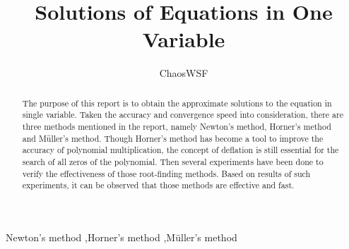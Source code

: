 \documentclass[preprint,12pt]{elsarticle}
\begin{document}
\begin{frontmatter}


\title{Solutions of Equations in One Variable}




\author{ChaosWSF}

\address{No.0, University}

\begin{abstract}
The purpose of this report is to obtain the approximate solutions to the equation in single variable. Taken the accuracy and convergence speed into consideration, there are three methods mentioned in the report, namely Newton's method, Horner's method and M\"uller's method. Though Horner's method has become a tool to improve the accuracy of polynomial multiplication, the concept of deflation is still essential for the search of all zeros of the polynomial. Then several experiments have been done to verify the effectiveness of those root-finding methods. Based on results of such experiments, it can be observed that those methods are effective and fast.
\end{abstract}

\begin{keyword}
Newton's method \sep Horner's method \sep M{\"u}ller's method


\end{keyword}

\end{frontmatter}
\end{document}
